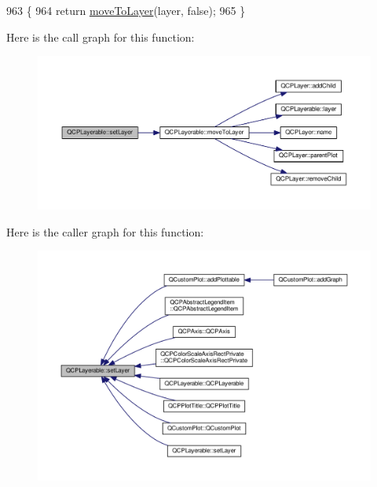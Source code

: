 \begin{DoxyCode}
963 \{
964   \textcolor{keywordflow}{return} \hyperlink{class_q_c_p_layerable_af94484cfb7cbbddb7de522e9be71d9a4}{moveToLayer}(layer, \textcolor{keyword}{false});
965 \}
\end{DoxyCode}


Here is the call graph for this function\+:\nopagebreak
\begin{figure}[H]
\begin{center}
\leavevmode
\includegraphics[width=350pt]{class_q_c_p_layerable_ab0d0da6d2de45a118886d2c8e16d5a54_cgraph}
\end{center}
\end{figure}




Here is the caller graph for this function\+:\nopagebreak
\begin{figure}[H]
\begin{center}
\leavevmode
\includegraphics[width=350pt]{class_q_c_p_layerable_ab0d0da6d2de45a118886d2c8e16d5a54_icgraph}
\end{center}
\end{figure}


\hypertarget{class_q_c_p_layerable_ab25a0e7b897993b44447caee0f142083}{}
